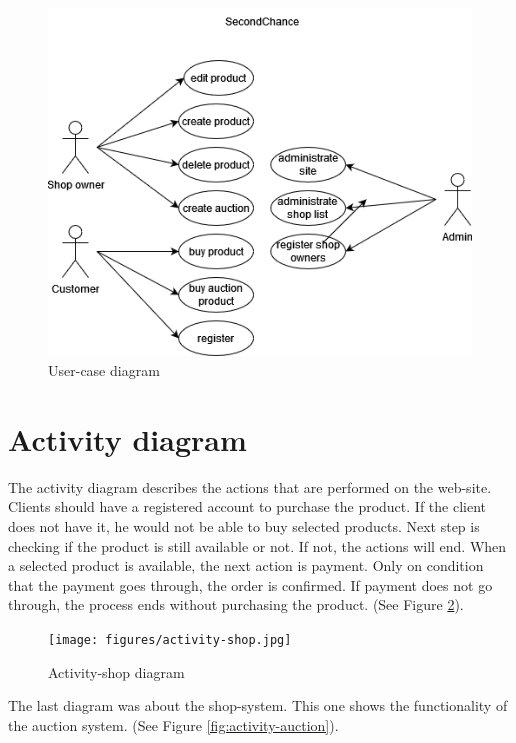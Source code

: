 \begin{figure}[h!]
    \centering
    \includegraphics[scale=0.6]{figures/user-case.png}
    \caption{User-case diagram}
    \label{fig:user-case}
\end{figure}
\clearpage


\section{Activity diagram}
The activity diagram describes the actions that are performed on the web-site. Clients should have a registered account to purchase the product. If the client does not have it, he would not be able to buy selected products. Next step is checking if the product is still available or not. If not, the actions will end. When a selected product is available, the next action is payment. Only on condition that the payment goes through, the order is confirmed. If payment does not go through, the process ends without purchasing the product. (See Figure \ref{fig:activity-shop}).

\begin{figure}[h!]
    \centering
    \texttt{[image: figures/activity-shop.jpg]}
    \caption{Activity-shop diagram}
    \label{fig:activity-shop}
\end{figure}
\clearpage

The last diagram was about the shop-system. This one shows the functionality of the auction system. (See Figure \ref{fig:activity-auction}).

